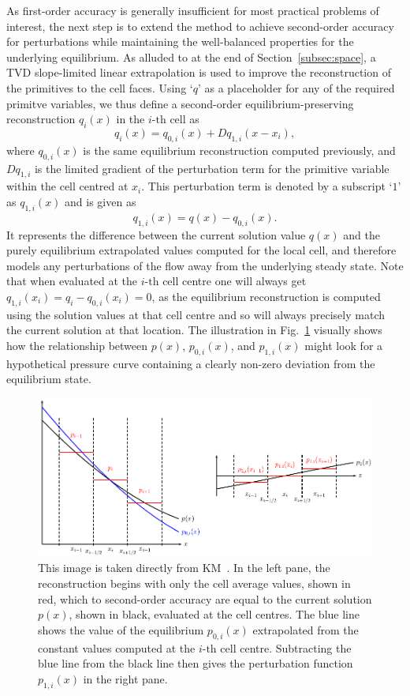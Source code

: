 As first-order accuracy is generally insufficient for most practical problems of interest, the next step is to extend the method to achieve second-order accuracy for perturbations while maintaining the well-balanced properties for the underlying equilibrium. As alluded to at the end of Section~\ref{subsec:space}, a TVD slope-limited linear extrapolation is used to improve the reconstruction of the primitives to the cell faces. Using `$q$' as a placeholder for any of the required primitve variables, we thus define a second-order equilibrium-preserving reconstruction $q_i(x)$ in the $i\textrm{-th}$ cell as
\begin{equation}
q_i(x)=q_{0,i}(x)+Dq_{1,i}(x-x_i),
\end{equation}
where $q_{0,i}(x)$ is the same equilibrium reconstruction computed previously, and $Dq_{1,i}$ is the limited gradient of the perturbation term for the primitive variable within the cell centred at $x_i$. This perturbation term is denoted by a subscript `$1$' as $q_{1,i}(x)$ and is given as
\begin{equation}
q_{1,i}(x)=q(x)-q_{0,i}(x).
\end{equation}
It represents the difference between the current solution value $q(x)$ and the purely equilibrium extrapolated values computed for the local cell, and therefore models any perturbations of the flow away from the underlying steady state. Note that when evaluated at the $i\textrm{-th}$ cell centre one will always get $q_{1,i}(x_i)=q_i-q_{0,i}(x_i)=0$, as the equilibrium reconstruction is computed using the solution values at that cell centre and so will always precisely match the current solution at that location. The illustration in Fig.~\ref{fig:Kappeli1} visually shows how the relationship between $p(x)$, $p_{0,i}(x)$, and $p_{1,i}(x)$ might look for a hypothetical pressure curve containing a clearly non-zero deviation from the equilibrium state.
\begin {figure}
\centering
\includegraphics[width=13cm]{figures/Kaeppeli1}
\caption{This image is taken directly from KM~\cite{Kappeli2014}. In the left pane, the reconstruction begins with only the cell average values, shown in red, which to second-order accuracy are equal to the current solution $p(x)$, shown in black, evaluated at the cell centres. The blue line shows the value of the equilibrium $p_{0,i}(x)$ extrapolated from the constant values computed at the $i\textrm{-th}$ cell centre. Subtracting the blue line from the black line then gives the perturbation function $p_{1,i}(x)$ in the right pane.}
\label{fig:Kappeli1}
\end{figure}

